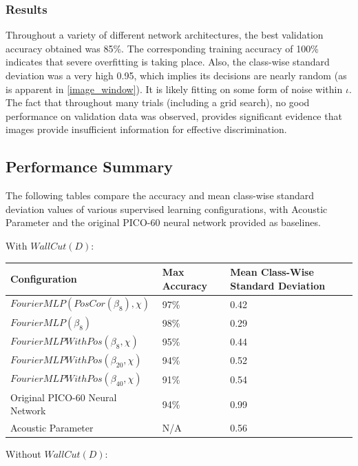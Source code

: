 \documentclass[10pt]{article}
\begin{document}
\subsubsection{Results}

Throughout a variety of different network architectures, the best validation accuracy obtained was 85\%. The corresponding training accuracy of 100\% indicates that severe overfitting is taking place. Also, the class-wise standard deviation was a very high 0.95, which implies its decisions are nearly random (as is apparent in \ref{image_window}). It is likely fitting on some form of noise within $\iota$. The fact that throughout many trials (including a grid search), no good performance on validation data was observed, provides significant evidence that images provide insufficient information for effective discrimination.

\subsection{Performance Summary}

The following tables compare the accuracy and mean class-wise standard deviation values of various supervised learning configurations, with Acoustic Parameter and the original PICO-60 neural network provided as baselines.

With $WallCut(D)$:

\begin{tabular}{|l|l|l|}
    \hline
    Configuration & Max Accuracy & Mean Class-Wise Standard Deviation \\
    \hline
    $FourierMLP(PosCor(\beta_{8}), \chi)$ & 97\% & 0.42 \\
    \hline
    $FourierMLP(\beta_{8})$ & 98\% & 0.29 \\
    \hline
    $FourierMLPWithPos(\beta_{8}, \chi)$ & 95\% & 0.44 \\
    \hline
    $FourierMLPWithPos(\beta_{20}, \chi)$ & 94\% & 0.52 \\
    \hline
    $FourierMLPWithPos(\beta_{40}, \chi)$ & 91\% & 0.54 \\
    \hline
    Original PICO-60 Neural Network & 94\% & 0.99 \\
    \hline
    Acoustic Parameter & N/A & 0.56 \\
    \hline
\end{tabular}

Without $WallCut(D)$:
\end{document}
